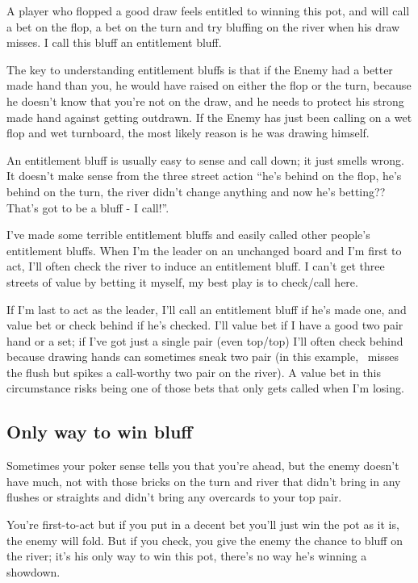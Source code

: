A player who flopped a good draw feels entitled to winning
this pot, and will call a bet on the flop, a bet on the turn
and try bluffing on the river when his draw misses. I call
this bluff an entitlement bluff.

The key to understanding entitlement bluffs is that if the Enemy had a
better made hand than you, he would have raised on either the flop or
the turn, because he doesn't know that you're not on the draw, and he
needs to protect his strong made hand against getting outdrawn. If the
Enemy has just been calling on a wet flop and wet turnboard, the most
likely reason is he was drawing himself.

An entitlement bluff is usually easy to sense and call down; it
just smells wrong. It doesn't make sense from the three street action
``he's behind on the flop, he's behind on the turn, the river
didn't change anything and now he's betting?? That's got to be
a bluff - I call!''.

I've made some terrible entitlement bluffs and easily called
other people's entitlement bluffs. When I'm the leader on
an unchanged board and I'm first to act, I'll often check the
river to induce an entitlement bluff. I can't get three streets
of value by betting it myself, my best play is to check/call here.

If I'm last to act as the leader, I'll call an entitlement bluff
if he's made one, and value bet or check behind if he's checked.
I'll value bet if I have a good two pair hand or a set; if I've
got just a single pair (even top/top) I'll often check behind
because drawing hands can sometimes sneak two pair (in this example,
\sixd\fived\ misses the flush but spikes a call-worthy two pair
on the river). A value bet in this circumstance risks being one
of those bets that only gets called when I'm losing.

\subsection{Only way to win bluff}

Sometimes your poker sense tells you that you're ahead, but the enemy
doesn't have much, not with those bricks on the turn and river that
didn't bring in any flushes or straights and didn't bring any
overcards to your top pair.

You're first-to-act but if you put in a decent bet you'll just win the
pot as it is, the enemy will fold. But if you check, you give the
enemy the chance to bluff on the river; it's his only way to win this
pot, there's no way he's winning a showdown.

